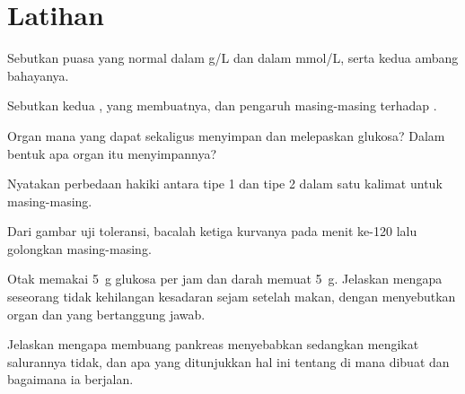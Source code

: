 \section{Latihan}

\begin{exercise}[$\star$]\label{exo:g12:glucose-and-diabetes:1}
Sebutkan  puasa yang normal dalam \unit{g/L} dan dalam
\unit{mmol/L}, serta kedua ambang bahayanya.
\end{exercise}

\begin{exercise}[$\star$]\label{exo:g12:glucose-and-diabetes:2}
Sebutkan kedua  ,  yang membuatnya, dan
pengaruh masing-masing terhadap .
\end{exercise}

\begin{exercise}[$\star$]\label{exo:g12:glucose-and-diabetes:3}
Organ mana yang dapat sekaligus menyimpan dan melepaskan glukosa?
Dalam bentuk apa organ itu menyimpannya?
\end{exercise}

\begin{exercise}[$\star$]\label{exo:g12:glucose-and-diabetes:4}
Nyatakan perbedaan hakiki antara  tipe 1 dan tipe 2 dalam satu
kalimat untuk masing-masing.
\end{exercise}

\begin{exercise}[$\star$]\label{exo:g12:glucose-and-diabetes:5}
Dari gambar uji toleransi, bacalah ketiga kurvanya pada menit ke-120
lalu golongkan masing-masing.
\end{exercise}

\begin{exercise}[$\star\star$]\label{exo:g12:glucose-and-diabetes:6}
Otak memakai \qty{5}{g} glukosa per jam dan darah memuat \qty{5}{g}.
Jelaskan mengapa seseorang tidak kehilangan kesadaran sejam setelah
makan, dengan menyebutkan organ dan  yang bertanggung jawab.
\end{exercise}

\begin{exercise}[$\star\star$]\label{exo:g12:glucose-and-diabetes:7}
Jelaskan mengapa membuang pankreas menyebabkan  sedangkan
mengikat salurannya tidak, dan apa yang ditunjukkan hal ini tentang di
mana  dibuat dan bagaimana ia berjalan.
\end{exercise}

